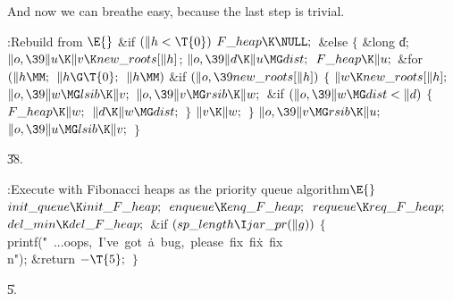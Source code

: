 And now we can breathe easy, because the last step is trivial.

\Y\B\4:Rebuild  from \X${}\E{}$\6
\&{if} ${}(\|h<\T{0}){}$\1\5
${}\\{F\_heap}\K\NULL;{}$\2\6
\&{else}\5
${}\{{}$\5
\1\&{long} \|d;\7
${}\|o,\39\|u\K\|v\K\\{new\_roots}[\|h]{}$;\6
${}\|o,\39\|d\K\|u\MG\\{dist};{}$\6
${}\\{F\_heap}\K\|u;{}$\6
\&{for} ${}(\|h\MM;{}$ ${}\|h\G\T{0};{}$ ${}\|h\MM){}$\1\6
\&{if} ${}(\|o,\39\\{new\_roots}[\|h]){}$\5
${}\{{}$\1\6
${}\|w\K\\{new\_roots}[\|h];{}$\6
${}\|o,\39\|w\MG\\{lsib}\K\|v;{}$\6
${}\|o,\39\|v\MG\\{rsib}\K\|w;{}$\6
\&{if} ${}(\|o,\39\|w\MG\\{dist}<\|d){}$\5
${}\{{}$\1\6
${}\\{F\_heap}\K\|w;{}$\6
${}\|d\K\|w\MG\\{dist};{}$\6
\4${}\}{}$\2\6
${}\|v\K\|w;{}$\6
\4${}\}{}$\2\2\6
${}\|o,\39\|v\MG\\{rsib}\K\|u;{}$\6
${}\|o,\39\|u\MG\\{lsib}\K\|v;{}$\6
\4${}\}{}$\2\par
\U38.\fi

\B{}:Execute  with Fibonacci heaps as the priority
queue algorithm\X${}\E{}$\6
$\\{init\_queue}\K\\{init\_F\_heap};{}$\6
${}\\{enqueue}\K\\{enq\_F\_heap};{}$\6
${}\\{requeue}\K\\{req\_F\_heap};{}$\6
${}\\{del\_min}\K\\{del\_F\_heap};{}$\6
\&{if} ${}(\\{sp\_length}\I\\{jar\_pr}(\|g)){}$\5
${}\{{}$\1\6
\\{printf}(\.{"\ ...oops,\ I've\ got\ }\)\.{a\ bug,\ please\ fix\ fi}\)\.{x\
fix\\n"});\6
\&{return} ${}{-}\T{5};{}$\6
\4${}\}{}$\2\par
\U5.\fi

